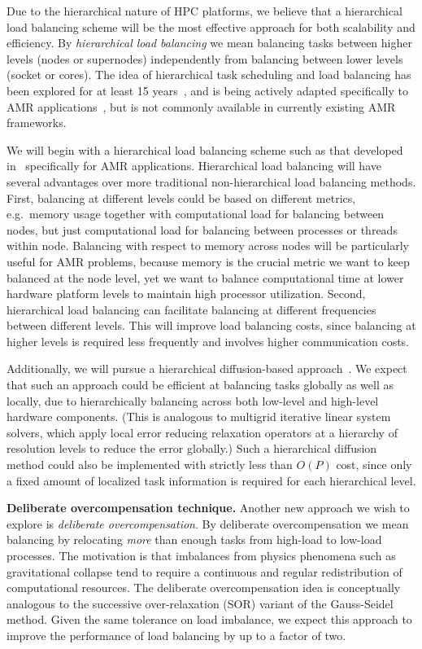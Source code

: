 \documentclass[11pt,letterpaper]{article}
\begin{document}
Due to the hierarchical nature of HPC platforms, we believe that a
hierarchical load balancing scheme will be the most effective approach
for both scalability and efficiency.  By \textit{hierarchical load
  balancing} we mean balancing tasks between higher levels (nodes or
supernodes) independently from balancing between lower levels
(socket or cores).  The idea of hierarchical task scheduling and load
balancing has been explored for at least 15 years~\cite{AhGh94}, and
is being actively adapted specifically to AMR
applications~\cite{LaTa06}, but is not commonly available in currently
existing AMR frameworks.

We will begin with a hierarchical load balancing scheme such as that
developed in~\cite{LaTa06} specifically for AMR applications.
Hierarchical load balancing will have several advantages over more
traditional non-hierarchical load balancing methods.  First,
balancing at different levels could be based on different metrics,
e.g.~memory usage together with computational load for balancing
between nodes, but just computational load for balancing between
processes or threads within node.  Balancing with respect to memory
across nodes will be particularly useful for AMR problems, because
memory is the crucial metric we want to keep balanced at the node
level, yet we want to balance computational time at lower hardware
platform levels to maintain high processor utilization.  Second,
hierarchical load balancing can facilitate balancing at different
frequencies between different levels.  This will improve load
balancing costs, since balancing at higher levels is required less
frequently and involves higher communication costs.

Additionally, we will pursue a hierarchical diffusion-based
approach~\cite{ScKa97}.  We expect that such an approach could be
efficient at balancing tasks globally as well as locally, due to
hierarchically balancing across both low-level and high-level hardware
components.  (This is analogous to multigrid iterative linear system
solvers, which apply local error reducing relaxation operators at a
hierarchy of resolution levels to reduce the error globally.)  Such a
hierarchical diffusion method could also be implemented with strictly
less than $O(P)$ cost, since only a fixed amount of localized task
information is required for each hierarchical level.

\textbf{Deliberate overcompensation technique.}
%
Another new approach we wish to explore is \textit{deliberate
  overcompensation}.  By deliberate overcompensation we mean
balancing by relocating \textit{more} than enough tasks from
high-load to low-load processes.  The motivation is that imbalances
from physics phenomena such as gravitational collapse tend to require
a continuous and regular redistribution of computational resources.
The deliberate overcompensation idea is conceptually analogous to the
successive over-relaxation (SOR) variant of the Gauss-Seidel method.
Given the same tolerance on load imbalance, we expect this approach to
improve the performance of load balancing by up to a factor of two.
\end{document}
